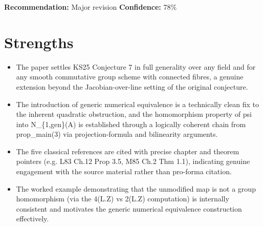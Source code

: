 \documentclass[11pt]{article}
\begin{document}
\textbf{Recommendation:} Major revision \quad \textbf{Confidence:} 78\%\\

\section*{Strengths}
\begin{itemize}[leftmargin=*]
  \item The paper settles KS25 Conjecture 7 in full generality over any field and for any smooth commutative group scheme with connected fibres, a genuine extension beyond the Jacobian-over-line setting of the original conjecture.
  \item The introduction of generic numerical equivalence is a technically clean fix to the inherent quadratic obstruction, and the homomorphism property of psi into N\_\{1,gen\}(A) is established through a logically coherent chain from prop\_main(3) via projection-formula and bilinearity arguments.
  \item The five classical references are cited with precise chapter and theorem pointers (e.g. L83 Ch.12 Prop 3.5, M85 Ch.2 Thm 1.1), indicating genuine engagement with the source material rather than pro-forma citation.
  \item The worked example demonstrating that the unmodified map is not a group homomorphism (via the 4(L.Z) vs 2(L.Z) computation) is internally consistent and motivates the generic numerical equivalence construction effectively.
\end{itemize}
\end{document}
